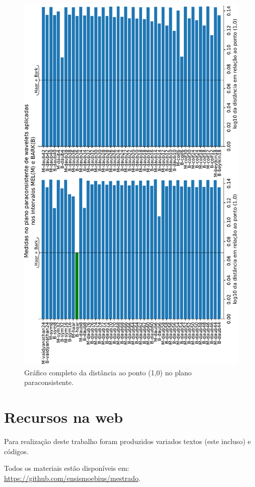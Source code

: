 \begin{apendicesenv}
\begin{figure}[h]
				\includegraphics[width=0.99\linewidth]{images/results/paraconsistentPlane/ParaconsistentFull}
				\caption{Gráfico completo da distância ao ponto (1,0) no plano paraconsistente.}
				\label{fig:paraconsistentfull}
			\end{figure}
	\chapter{Recursos na web}
		\par Para realização deste trabalho foram produzidos variados textos (este incluso) e códigos. 
		\par Todos os materiais estão disponíveis em:  \href{https://github.com/ensismoebius/mestrado}{https://github.com/ensismoebius/mestrado}.
\end{apendicesenv}